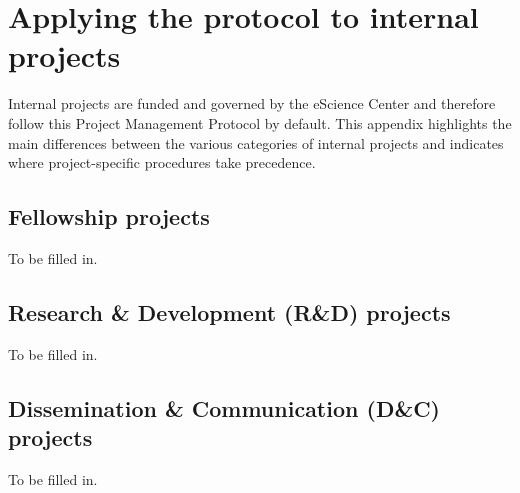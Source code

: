 \section{Applying the protocol to internal projects}
\label{app:internal-projects}
Internal projects are funded and governed by the eScience Center and therefore follow this Project Management Protocol 
by default. This appendix highlights the main differences between the various categories of internal projects and 
indicates where project-specific procedures take precedence.

\subsection{Fellowship projects}
To be filled in.

\subsection{Research \& Development (R\&D) projects}
To be filled in.

\subsection{Dissemination \& Communication (D\&C) projects}
To be filled in.
